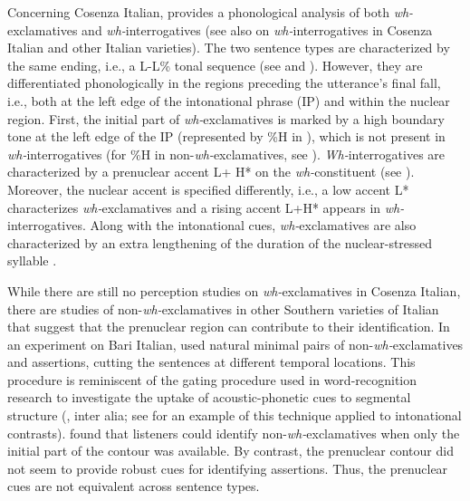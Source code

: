 \documentclass[output=paper]{langsci/langscibook}
\begin{document}
Concerning Cosenza Italian, \citet{Sorianello2011exclamative} provides a phonological analysis of both \textit{wh-}exclamatives and \textit{wh-}interrogatives (see also \citet[182]{GiliFivelaETAL2015intonationalvariation} on \textit{wh-}interrogatives in Cosenza Italian and other Italian varieties). The two sentence types are characterized by the same ending, i.e., a L-L\% tonal sequence (see  and ).  However, they are differentiated phonologically in the regions preceding the utterance’s final fall, i.e., both at the left edge of the intonational phrase (IP) and within the nuclear region. First, the initial part of \textit{wh-}exclamatives is marked by a high boundary tone at the left edge of the IP (represented by \%H in ), which is not present in \textit{wh-}interrogatives (for \%H in non-\textit{wh-}exclamatives, see \citealt{Sorianello2012,Avesani1995,Grice2005}). \textit{Wh-}interrogatives are characterized by a prenuclear accent L+ H* on the \textit{wh-}constituent (see ). Moreover, the nuclear accent is specified differently, i.e., a low accent L* characterizes \textit{wh-}exclamatives and a rising accent L+H* appears in \textit{wh-}interrogatives. Along with the intonational cues, \textit{wh-}exclamatives are also characterized by an extra lengthening of the duration of the nuclear-stressed syllable \citep{Sorianello2011exclamative}.

While there are still no perception studies on \textit{wh-}exclamatives in Cosenza Italian, there are studies of non-\textit{wh-}exclamatives in other Southern varieties of Italian that suggest that the prenuclear region can contribute to their identification. In an experiment on Bari Italian, \citet{Sorianello2012} used natural minimal pairs of non-\textit{wh-}exclamatives and assertions, cutting the sentences at different temporal locations. This procedure is reminiscent of the gating procedure used in word-recognition research to investigate the uptake of acoustic-phonetic cues to segmental structure (\citealt{Grosjean1980,Lahiri1991}, inter alia; see \citealt{Petrone.2011} for an example of this technique applied to intonational contrasts). \citet{Sorianello2012} found that listeners could identify non-\textit{wh-}exclamatives when only the initial part of the contour was available. By contrast, the prenuclear contour did not seem to provide robust cues for identifying assertions. Thus, the prenuclear cues are not equivalent across sentence types. 
\end{document}
